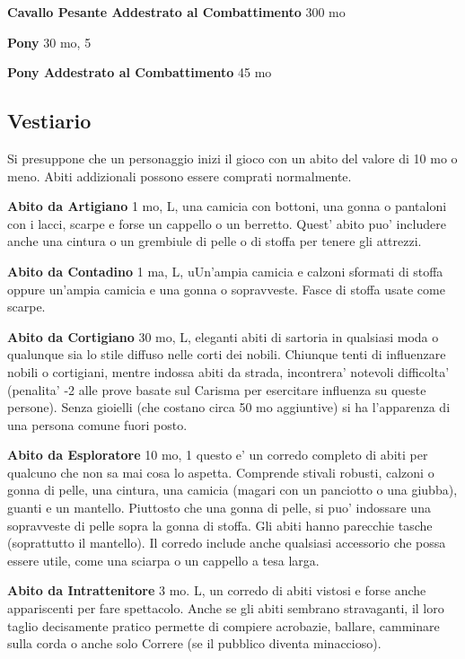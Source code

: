 \documentclass[a4paper,11pt,twoside,openany]{book}
\begin{document}
{		\textbf{Cavallo Pesante Addestrato al Combattimento} 300 mo
		
		\textbf{Pony} 30 mo, 5
		
		\textbf{Pony Addestrato al Combattimento} 45 mo
		
		\pagebreak
		
		\subsection{Vestiario}
		
		\label{vestiario}
		
		Si presuppone che un personaggio inizi il gioco con un abito del valore di 10 mo o meno. Abiti addizionali possono essere comprati normalmente.
		
		\textbf{Abito da Artigiano} 1 mo, L, una camicia con bottoni, una gonna o pantaloni con i lacci, scarpe e forse un cappello o un berretto. Quest' abito puo' includere anche una cintura o un grembiule di pelle o di stoffa per tenere gli attrezzi.
		
		\textbf{Abito da Contadino} 1 ma, L, uUn'ampia camicia e calzoni sformati di stoffa oppure un'ampia camicia e una gonna o sopravveste. Fasce di stoffa usate come scarpe.
		
		\textbf{Abito da Cortigiano} 30 mo, L, eleganti abiti di sartoria in qualsiasi moda o qualunque sia lo stile diffuso nelle corti dei nobili. Chiunque tenti di influenzare nobili o cortigiani, mentre indossa abiti da strada, incontrera' notevoli difficolta' (penalita' -2 alle prove basate sul Carisma per esercitare influenza su queste persone). Senza gioielli (che costano circa 50 mo aggiuntive) si ha l'apparenza di una persona comune fuori posto.
		
		\textbf{Abito da Esploratore} 10 mo, 1 questo e' un corredo completo di abiti per qualcuno che non sa mai cosa lo aspetta. Comprende stivali robusti, calzoni o gonna di pelle, una cintura, una camicia (magari con un panciotto o una giubba), guanti e un mantello. 
		Piuttosto che una gonna di pelle, si puo' indossare una sopravveste di pelle sopra la gonna di stoffa. Gli abiti hanno parecchie tasche (soprattutto il mantello). Il corredo include anche qualsiasi accessorio che possa essere utile, come una sciarpa o un cappello a tesa larga.
		
		\textbf{Abito da Intrattenitore} 3 mo. L,  un corredo di abiti vistosi e forse anche appariscenti per fare spettacolo. Anche se gli abiti sembrano stravaganti, il loro taglio decisamente pratico permette di compiere acrobazie, ballare, camminare sulla corda o anche solo Correre (se il pubblico diventa minaccioso).
		
}
\end{document}
